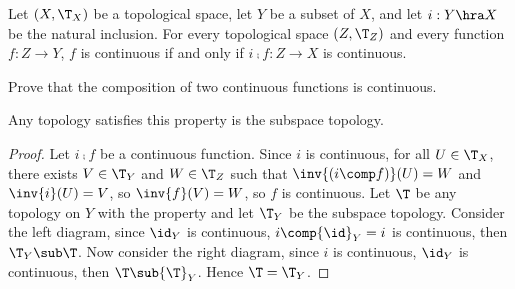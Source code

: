 \documentclass[10pt]{article}
\begin{document}
\begin{Universal property for subspace topology}
    Let $(X,{\T}_{X})$ be a topological space, let $Y$ be a subset of $X$, and let $i: Y\hra X$ be the natural inclusion. For every topological space $(Z,{\T}_{Z})$ and every function $f:Z\to Y$, $f$ is continuous if and only if $i\comp f:Z\to X$ is continuous.
\end{Universal property for subspace topology}
\begin{center}
\end{center}
\begin{problem}
    Prove that the composition of two continuous functions is continuous.
\end{problem}
\begin{proposition}
    Any topology satisfies this property is the subspace topology.
\end{proposition}
\begin{center}
    \hspace{2.5cm}
\end{center}
\begin{proof}
    Let $i\comp f$ be a continuous function. Since $i$ is continuous, for all $U\in{\T}_{X}$, there exists $V\in{\T}_{Y}$ and $W\in{\T}_{Z}$ such that $\inv{(i\comp f)}(U)=W$ and $\inv{i}(U)=V$, so $\inv{f}(V)=W$, so $f$ is continuous. Let $\T$ be any topology on $Y$ with the property and let ${\T}_{Y}$ be the subspace topology. Consider the left diagram, since ${\id}_{Y}$ is continuous, $i\comp{\id}_{Y}=i$ is continuous, then ${\T}_{Y}\sub\T$. Now consider the right diagram, since $i$ is continuous, ${\id}_{Y}$ is continuous, then $\T\sub{\T}_{Y}$. Hence $\T={\T}_{Y}$.
\end{proof}
\end{document}
